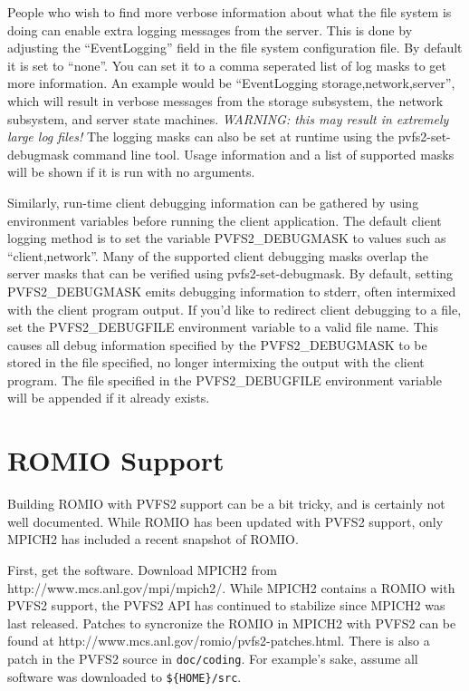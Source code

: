 \documentclass[11pt, letterpaper]{article}
\begin{document}
People who wish to find more verbose information about what the file
system is doing can enable extra logging messages from the server.
This is done by adjusting the ``EventLogging'' field in the file
system configuration file.  By default it is set to ``none''.  You can
set it to a comma seperated list of log masks to get more information.
An example would be ``EventLogging storage,network,server'', which
will result in verbose messages from the storage subsystem, the
network subsystem, and server state machines.  \emph{WARNING: this may
result in extremely large log files!}  The logging masks can also be
set at runtime using the pvfs2-set-debugmask command line tool.  Usage
information and a list of supported masks will be shown if it is run
with no arguments.

Similarly, run-time client debugging information can be gathered by
using environment variables before running the client application.
The default client logging method is to set the variable
PVFS2\_DEBUGMASK to values such as ``client,network''.  Many of the
supported client debugging masks overlap the server masks that can be
verified using pvfs2-set-debugmask.  By default, setting
PVFS2\_DEBUGMASK emits debugging information to stderr, often
intermixed with the client program output.  If you'd like to redirect
client debugging to a file, set the PVFS2\_DEBUGFILE environment
variable to a valid file name.  This causes all debug information
specified by the PVFS2\_DEBUGMASK to be stored in the file specified,
no longer intermixing the output with the client program.  The file
specified in the PVFS2\_DEBUGFILE environment variable will be
appended if it already exists.

\section{ROMIO Support}
\label{sec:romio}

Building ROMIO with PVFS2 support can be a bit tricky, and is certainly
not well documented.  While ROMIO has been updated with PVFS2 support,
only MPICH2 has included a recent snapshot of ROMIO.  

First, get the software.  Download MPICH2 from
http://www.mcs.anl.gov/mpi/mpich2/.  While MPICH2 contains a ROMIO
with PVFS2 support, the PVFS2 API has continued to stabilize since
MPICH2 was last released.  Patches to syncronize the ROMIO in MPICH2
with PVFS2 can be found at
http://www.mcs.anl.gov/romio/pvfs2-patches.html.  There is also a
patch in the PVFS2 source in {\tt doc/coding}. For example's sake,
assume all software was downloaded to {\tt \$\{HOME\}/src}.
\end{document}
